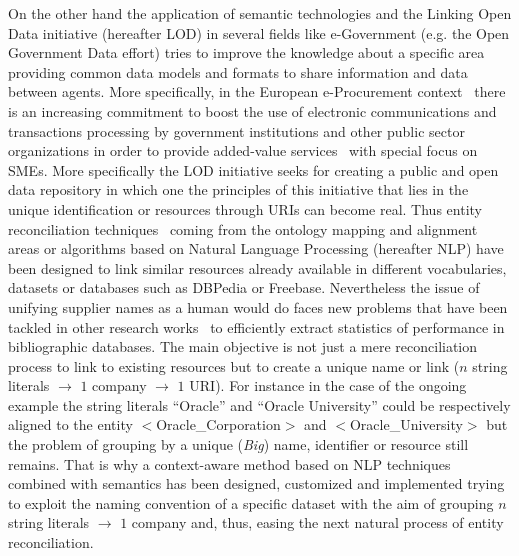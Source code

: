 \documentclass{llncs}
\begin{document}
On the other hand the application of semantic technologies and the Linking Open Data initiative (hereafter LOD) 
in several fields like e-Government (e.g. the Open Government Data effort) tries to improve the knowledge about a specific area providing 
common data models and formats to share information and data between agents. More specifically, in the European e-Procurement 
context~\cite{e-Proc-map-paper} there is an increasing commitment to boost the use of electronic communications and transactions 
processing by government institutions and other public sector organizations in order to provide added-value services~\cite{orgsODBook} 
with special focus on SMEs. More specifically the LOD initiative seeks for creating a public and open data repository in which one the principles of this initiative that lies in the 
unique identification or resources through URIs can become real. Thus entity reconciliation techniques~\cite{Serimi,conf/www/MaaliCP11} 
coming from the ontology mapping and alignment areas or algorithms based on Natural Language Processing (hereafter NLP) have been 
designed to link similar resources already available in different vocabularies, datasets or databases such as DBPedia or Freebase. 
Nevertheless the issue of unifying supplier names as a human would do faces new problems that have been tackled in 
other research works~\cite{Galvez2006} to efficiently extract statistics of performance in bibliographic databases. The main objective is not just a 
mere reconciliation process to link to existing resources but to create a unique name or link ($n$ string literals $\to$ $1$ company $\to$ $1$ URI). 
For instance in the case of the ongoing example the string literals ``Oracle'' and ``Oracle University'' could be respectively aligned to the entity $<$Oracle\_Corporation$>$ and $<$Oracle\_University$>$ but 
the problem of grouping by a unique (\textit{Big}) name, identifier or resource still remains. That is why a context-aware method based on NLP 
techniques combined with semantics has been designed, customized and implemented trying to exploit the naming convention of a specific dataset with the aim 
of grouping $n$ string literals $\to$ $1$ company and, thus, easing the next natural process of entity reconciliation.
\end{document}
